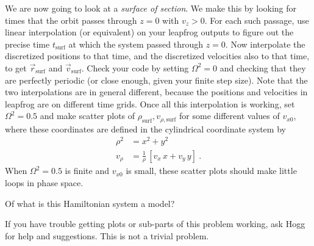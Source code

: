 \documentclass[12pt]{article}
\begin{document}
\begin{problem}
  \subpart We are now going to look at a \emph{surface of section}.
  We make this by looking for times that the orbit passes through $z=0$ with $v_z>0$.
  For each such passage, use linear interpolation (or equivalent) on your leapfrog outputs to figure out the precise time $t_\text{surf}$ at which the system passed through $z=0$.
  Now interpolate the discretized positions to that time, and the discretized velocities also to that time, to get $\vec{r}_\text{surf}$ and $\vec{v}_\text{surf}$.
  Check your code by setting $\Omega^2=0$ and checking that they are perfectly periodic (or close enough, given your finite step size).
  Note that the two interpolations are in general different, because the positions and velocities in leapfrog are on different time grids.
  Once all this interpolation is working, set $\Omega^2=0.5$ and make scatter plots of $\rho_\text{surf},v_{\rho,\text{surf}}$ for some different values of $v_{x0}$, where these coordinates are defined in the cylindrical coordinate system by
  \begin{align}
    \rho^2 &= x^2 + y^2 \\
    v_\rho &= \frac{1}{\rho}\,[v_x\,x + v_y\,y] ~.
  \end{align}
  When $\Omega^2=0.5$ is finite and $v_{x0}$ is small, these scatter plots should make little loops in phase space.
\end{problem}

\begin{note}
  Of what is this Hamiltonian system a model?
\end{note}

\begin{note}
  If you have trouble getting plots or sub-parts of this problem working, ask Hogg for help and suggestions.
  This is not a trivial problem.
\end{note}
\end{document}
